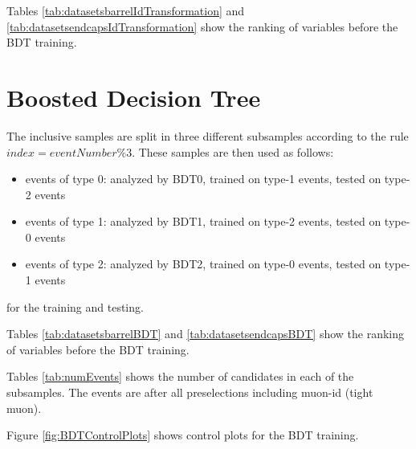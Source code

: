 \documentclass[10pt,a4paper]{article}
\begin{document}
Tables \ref{tab:datasetsbarrelIdTransformation} and \ref{tab:datasetsendcapsIdTransformation} show the ranking of variables before
the BDT training.






\section{Boosted Decision Tree}

The inclusive samples are split in three different subsamples according to the rule $index = eventNumber\%3$.
These samples are then used as follows:
\begin{itemize}
\item events of type 0: analyzed by BDT0, trained on type-1 events, tested on type-2 events
\item events of type 1: analyzed by BDT1, trained on type-2 events, tested on type-0 events
\item events of type 2: analyzed by BDT2, trained on type-0 events, tested on type-1 events
\end{itemize}
for the training and testing.

Tables \ref{tab:datasetsbarrelBDT} and \ref{tab:datasetsendcapsBDT} show the ranking of variables before
the BDT training.



Tables \ref{tab:numEvents} shows the number of candidates in each of the subsamples. The events are after
all preselections including muon-id (tight muon).


Figure \ref{fig:BDTControlPlots} shows control plots for the BDT training.
\end{document}
